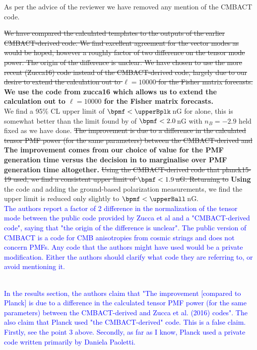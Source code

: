 \documentclass{article}
\begin{document}
As per the advice of the reviewer we have removed any mention of the CMBACT code.

\textcolor{PineGreen}{
\st{
We have compared the calculated templates to the outputs of the earlier CMBACT-derived code.
We find excellent agreement  for the vector modes as would be hoped, however a roughly factor of two difference on the tensor mode power. 
The origin of the difference is unclear.
We have chosen to use the more recent (Zucca16) code instead of the CMBACT-derived code, largely due to our desire to extend the calculation out to $\ell=10000$ for the Fisher matrix forecasts.}
\textbf{We use the code from zucca16 which allows us to extend the calculation out to $\ell=10000$ for the Fisher matrix forecasts.}}
\\

\textcolor{PineGreen}{
We find a 95\% CL upper limit of $\bpmf < \upperBplk$\,nG for \planck{} alone,
this is somewhat better than the limit found by \citet{planck15-19} of $\bpmf < 2.0$\,nG with $n_B=-2.9$ held fixed as we have done.}
\textcolor{PineGreen}{
\st{The improvement is due to a difference in the calculated tensor PMF power (for the same parameters) between the CMBACT-derived and \citet{zucca16}}}
\textcolor{PineGreen}{
\textbf{The improvement comes from our choice of value for the PMF generation time versus the decision in \citet{planck15-19} to marginalise over PMF generation time altogether.}}
\textcolor{PineGreen}{
\st{Using the CMBACT-derived code that planck15-19 used, we find a consistent upper limit of $\bpmf < 1.9$\,nG.
Returning to} \textbf{Using} the \citet{zucca16} code and adding the ground-based polarization measurements, we find the upper limit is  reduced only slightly to $\bpmf < \upperBall$\,nG.}
\\

\textcolor{blue}{The authors report a factor of 2 difference in the normalization of the tensor mode between the public code provided by Zucca et al and a "CMBACT-derived code", saying that "the origin of the difference is unclear". The public version of CMBACT is a code for CMB anisotropies from cosmic strings and does not concern PMFs. Any code that the authors might have used would be a private modification. Either the authors should clarify what code they are referring to, or avoid mentioning it.}

\textcolor{pinegreen}{}
\\

\textcolor{blue}{In the results section, the authors claim that "The improvement [compared to Planck] is due to a difference in the calculated tensor PMF power (for the same
parameters) between the CMBACT-derived and Zucca et al. (2016) codes". The also claim that Planck used "the CMBACT-derived" code. This is a false claim. Firstly, see the point 3 above. Secondly, as far as I know, Planck used a private code written primarily by Daniela Paoletti.}
\end{document}
